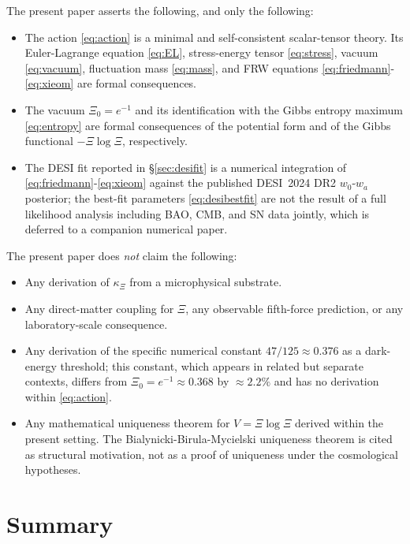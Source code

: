 \documentclass[11pt,reqno]{amsart}
\theoremstyle{plain}
\theoremstyle{definition}
\theoremstyle{remark}
\begin{document}
The present paper asserts the following, and only the following:
\begin{itemize}
  \item The action \eqref{eq:action} is a minimal and self-consistent
        scalar-tensor theory. Its Euler-Lagrange equation \eqref{eq:EL},
        stress-energy tensor \eqref{eq:stress}, vacuum \eqref{eq:vacuum},
        fluctuation mass \eqref{eq:mass}, and FRW equations
        \eqref{eq:friedmann}-\eqref{eq:xieom} are formal consequences.
  \item The vacuum $\Xi_0=e^{-1}$ and its identification with the Gibbs
        entropy maximum \eqref{eq:entropy} are formal consequences of the
        potential form and of the Gibbs functional $-\Xi\log\Xi$,
        respectively.
  \item The DESI fit reported in \S\ref{sec:desifit} is a numerical
        integration of \eqref{eq:friedmann}-\eqref{eq:xieom} against the
        published DESI~2024 DR2 $w_0$-$w_a$ posterior; the best-fit
        parameters \eqref{eq:desibestfit} are not the result of a full
        likelihood analysis including BAO, CMB, and SN data jointly, which
        is deferred to a companion numerical paper.
\end{itemize}

The present paper does \emph{not} claim the following:
\begin{itemize}
  \item Any derivation of $\kappa_\Xi$ from a microphysical substrate.
  \item Any direct-matter coupling for $\Xi$, any observable fifth-force
        prediction, or any laboratory-scale consequence.
  \item Any derivation of the specific numerical constant
        $47/125\approx 0.376$ as a dark-energy threshold; this constant,
        which appears in related but separate contexts, differs from
        $\Xi_0=e^{-1}\approx 0.368$ by $\approx 2.2\%$ and has no
        derivation within \eqref{eq:action}.
  \item Any mathematical uniqueness theorem for $V=\Xi\log\Xi$ derived
        within the present setting. The Bialynicki-Birula-Mycielski
        uniqueness theorem \cite{BialynickiBirulaMycielski1976} is cited
        as structural motivation, not as a proof of uniqueness under the
        cosmological hypotheses.
\end{itemize}

\section{Summary}
\end{document}
